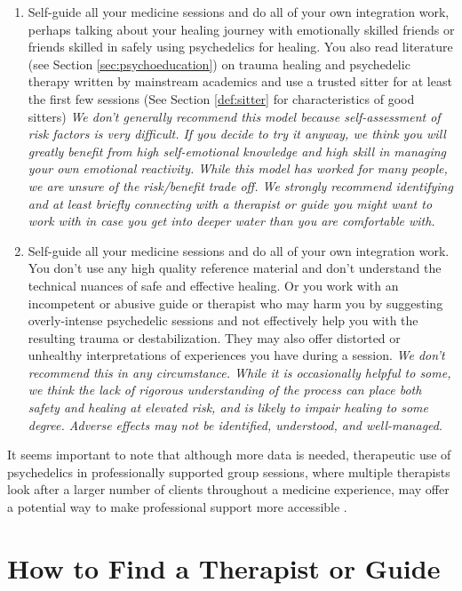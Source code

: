 \documentclass[12pt,letterpaper]{book}
\begin{document}
\begin{enumerate}
    \item Self-guide all your medicine sessions and do all of your own integration work, perhaps talking about your healing journey with emotionally skilled friends or friends skilled in safely using psychedelics for healing. You also read literature (see Section \ref{sec:psychoeducation}) on trauma healing and psychedelic therapy written by mainstream academics and use a trusted sitter for at least the first few sessions (See Section \ref{def:sitter} for characteristics of good sitters) \textit{We don't generally recommend this model because self-assessment of risk factors is very difficult. If you decide to try it anyway, we think you will greatly benefit from high self-emotional knowledge and high skill in managing your own emotional reactivity. While this model has worked for many people, we are unsure of the risk/benefit trade off. We strongly recommend identifying and at least briefly connecting with a therapist or guide you might want to work with in case you get into deeper water than you are comfortable with.}
    \item Self-guide all your medicine sessions and do all of your own integration work. You don't use any high quality reference material and don't understand the technical nuances of safe and effective healing. Or you work with an incompetent or abusive guide or therapist who may harm you by suggesting overly-intense psychedelic sessions and not effectively help you with the resulting trauma or destabilization. They may also offer distorted or unhealthy interpretations of experiences you have during a session. \textit{We don't recommend this in any circumstance. While it is occasionally helpful to some, we think the lack of rigorous understanding of the process can place both safety and healing at elevated risk, and is likely to impair healing to some degree. Adverse effects may not be identified, understood, and well-managed}.
\end{enumerate}
It seems important to note that although more data is needed, therapeutic use of psychedelics in professionally supported group sessions, where multiple therapists look after a larger number of clients throughout a medicine experience, may offer a potential way to make professional support more accessible \cite{marseille2023group}.

\section{How to Find a Therapist or Guide}
\label{sec:howtofind}
\end{document}
